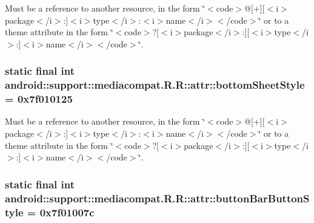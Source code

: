 Must be a reference to another resource, in the form \char`\"{}$<$code$>$@\mbox{[}+\mbox{]}\mbox{[}$<$i$>$package$<$/i$>$:\mbox{]}$<$i$>$type$<$/i$>$:$<$i$>$name$<$/i$>$$<$/code$>$\char`\"{} or to a theme attribute in the form \char`\"{}$<$code$>$?\mbox{[}$<$i$>$package$<$/i$>$:\mbox{]}\mbox{[}$<$i$>$type$<$/i$>$:\mbox{]}$<$i$>$name$<$/i$>$$<$/code$>$\char`\"{}. \hypertarget{classandroid_1_1support_1_1mediacompat_1_1_r_1_1attr_7b51d31af4c14a489809fbfc6512dae5}{
\subsubsection[{bottomSheetStyle}]{\setlength{\rightskip}{0pt plus 5cm}static final int android::support::mediacompat.R.R::attr::bottomSheetStyle = 0x7f010125}}
\label{classandroid_1_1support_1_1mediacompat_1_1_r_1_1attr_7b51d31af4c14a489809fbfc6512dae5}


Must be a reference to another resource, in the form \char`\"{}$<$code$>$@\mbox{[}+\mbox{]}\mbox{[}$<$i$>$package$<$/i$>$:\mbox{]}$<$i$>$type$<$/i$>$:$<$i$>$name$<$/i$>$$<$/code$>$\char`\"{} or to a theme attribute in the form \char`\"{}$<$code$>$?\mbox{[}$<$i$>$package$<$/i$>$:\mbox{]}\mbox{[}$<$i$>$type$<$/i$>$:\mbox{]}$<$i$>$name$<$/i$>$$<$/code$>$\char`\"{}. \hypertarget{classandroid_1_1support_1_1mediacompat_1_1_r_1_1attr_afd99ef7bb5a77466dc996111b8cf702}{
\subsubsection[{buttonBarButtonStyle}]{\setlength{\rightskip}{0pt plus 5cm}static final int android::support::mediacompat.R.R::attr::buttonBarButtonStyle = 0x7f01007c}}
\label{classandroid_1_1support_1_1mediacompat_1_1_r_1_1attr_afd99ef7bb5a77466dc996111b8cf702}



